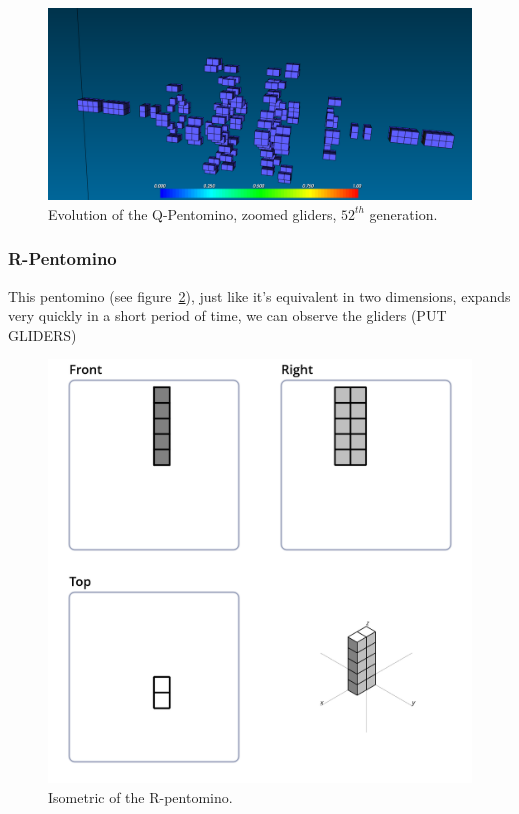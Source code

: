 \begin{figure}
	\centering
	\includegraphics[scale=0.3]{pentominoes_ss/q_52_gliders.png}
	\caption{Evolution of the Q-Pentomino, zoomed gliders, $52^{th}$ generation.}
  \label{fig:ss-pent:q-52-gliders}
\end{figure}

\subsubsection{R-Pentomino}
\label{sec:r-pentomino}
This pentomino (see figure~\ref{fig:iso-pent-r}), just like it's equivalent in
two dimensions, expands very quickly in a short period of time, we can observe
the gliders (PUT GLIDERS)

\begin{figure}
	\centering
	\includegraphics[scale=0.3]{iso_diagrams/o.png}
	\caption{Isometric of the R-pentomino.}
  \label{fig:iso-pent-r}
\end{figure}

